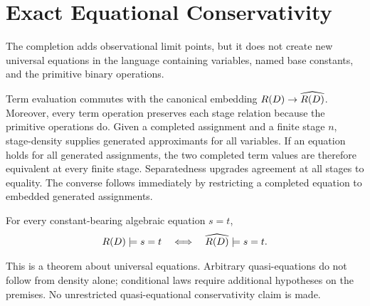 \section{Exact Equational Conservativity}\label{sec:equations}

The completion adds observational limit points, but it does not create new
universal equations in the language containing variables, named base constants,
and the primitive binary operations.

Term evaluation commutes with the canonical embedding
$R(D)\to\widehat{R(D)}$.  Moreover, every term operation preserves each
stage relation because the primitive operations do.  Given a completed
assignment and a finite stage $n$, stage-density supplies generated
approximants for all variables.  If an equation holds for all generated
assignments, the two completed term values are therefore equivalent at every
finite stage.  Separatedness upgrades agreement at all stages to equality.
The converse follows immediately by restricting a completed equation to
embedded generated assignments.

\begin{theorem}
\label{thm:equational-conservativity}
For every constant-bearing algebraic equation $s=t$,
\[
  R(D)\models s=t
  \quad\Longleftrightarrow\quad
  \widehat{R(D)}\models s=t.
\]
\end{theorem}

\begin{remark}[Scope]
This is a theorem about universal equations.  Arbitrary quasi-equations do not
follow from density alone; conditional laws require additional hypotheses on
the premises.  No unrestricted quasi-equational conservativity claim is made.
\end{remark}
